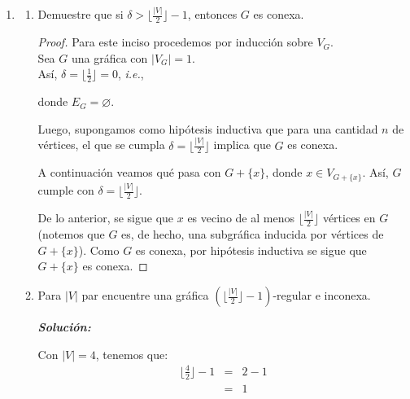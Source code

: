 \documentclass{article}
\begin{document}
\begin{enumerate}
  \item \begin{enumerate}

    \item Demuestre que si $\delta > \lfloor \frac{|V|}{2} \rfloor - 1$,
      entonces $G$ es conexa.

      \renewcommand\qedsymbol{QED}
      \begin{proof}
        Para este inciso procedemos por inducción sobre $V_G$. \\
        Sea $G$ una gráfica con $|V_G| = 1$. \\
        Así, $\delta = \lfloor \frac{1}{2} \rfloor = 0$, \textit{i.e.},

        \begin{figure}[ht!]
          \centering
        \end{figure}

        donde $E_G = \varnothing$.
        
        Luego, supongamos como hipótesis inductiva que para una cantidad $n$ de
        vértices, el que se cumpla $\delta = \lfloor \frac{|V|}{2} \rfloor$ implica
        que $G$ es conexa.
        
        A continuación veamos qué pasa con $G + \{x\}$, donde $x \in V_{G + \{x\}}$.
        Así, $G$ cumple con $\delta = \lfloor \frac{|V|}{2} \rfloor$.
        
        De lo anterior, se sigue que $x$ es vecino de al menos $\lfloor \frac{|V|}{2}
        \rfloor$ vértices en $G$ (notemos que $G$ es, de hecho, una subgráfica inducida
        por vértices de $G +\{x\}$). Como $G$ es conexa, por hipótesis inductiva se sigue
        que $G + \{x\}$ es conexa. 
      \end{proof}

    \item Para $|V|$ par encuentre una gr\'afica $(\lfloor \frac{|V|}{2}
      \rfloor -1)$-regular e inconexa.

      \textbf{\textit{Solución:}}

      Con $|V| = 4$, tenemos que:
      \begin{eqnarray*}
        \lfloor \frac{4}{2} \rfloor -1 &=& 2 -1\\
        &=& 1
      \end{eqnarray*}


\end{enumerate}
\end{enumerate}
\end{document}
